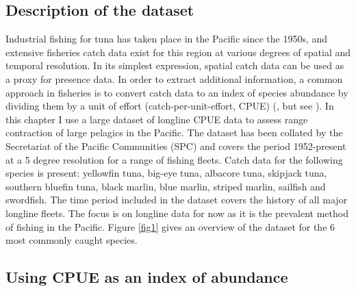 \documentclass{article}
\begin{document}

\subsection{Description of the dataset}

Industrial fishing for tuna has taken place in the Pacific since the
1950s, and extensive fisheries catch data exist for this region at
various degrees of spatial and temporal resolution. In its simplest
expression, spatial catch data can be used as a proxy for presence
data. In order to extract additional information, a common approach in
fisheries is to convert catch data to an index of species abundance by dividing
them by a unit of effort (catch-per-unit-effort, CPUE)
(\citealt{Maunder2004_a}, but see \citealt{Harley2001_a}). In this
chapter I use a large dataset of longline CPUE data
to assess range contraction of large pelagics in the
Pacific. The dataset has
been collated by the Secretariat of the Pacific Communities (SPC) and
covers the period 1952-present at a 5 degree
resolution for a range of fishing fleets. Catch data for the following species is
present: yellowfin tuna, big-eye tuna, albacore tuna, skipjack
tuna, southern bluefin tuna, black marlin, blue marlin, striped
marlin, sailfish and swordfish. The time period included in the dataset
covers the history of all major longline fleets. The focus is on
longline data for now as it is the prevalent method of fishing in the
Pacific. Figure \ref{fig1} gives an overview of the dataset for the 6 most
commonly caught species.


\subsection{Using CPUE as an index of abundance}
\end{document}
